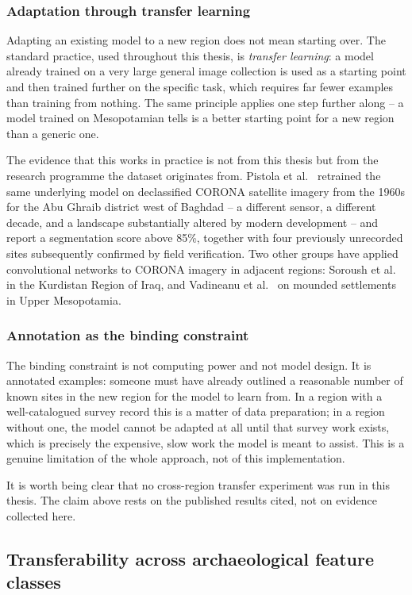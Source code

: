 \subsubsection{Adaptation through transfer learning}
Adapting an existing model to a new region does not mean starting over. The
standard practice, used throughout this thesis, is \emph{transfer learning}: a
model already trained on a very large general image collection is used as a
starting point and then trained further on the specific task, which requires
far fewer examples than training from nothing. The same principle applies one
step further along -- a model trained on Mesopotamian tells is a better
starting point for a new region than a generic one.

The evidence that this works in practice is not from this thesis but from the
research programme the dataset originates from. Pistola et al.~\cite{Pistola25}
retrained the same underlying model on declassified CORONA satellite imagery
from the 1960s for the Abu Ghraib district west of Baghdad -- a different
sensor, a different decade, and a landscape substantially altered by modern
development -- and report a segmentation score above 85\%, together with four
previously unrecorded sites subsequently confirmed by field verification. Two
other groups have applied convolutional networks to CORONA imagery in adjacent
regions: Soroush et al.~\cite{Soroush20} in the Kurdistan Region of Iraq, and
Vadineanu et al.~\cite{Vadineanu24} on mounded settlements in Upper
Mesopotamia.

\subsubsection{Annotation as the binding constraint}
The binding constraint is not computing power and not model design. It is
annotated examples: someone must have already outlined a reasonable number of
known sites in the new region for the model to learn from. In a region with a
well-catalogued survey record this is a matter of data preparation; in a region
without one, the model cannot be adapted at all until that survey work exists,
which is precisely the expensive, slow work the model is meant to assist. This
is a genuine limitation of the whole approach, not of this implementation.

It is worth being clear that no cross-region transfer experiment was run in
this thesis. The claim above rests on the published results cited, not on
evidence collected here.

\subsection{Transferability across archaeological feature classes}
\label{sec:arch-structures}

